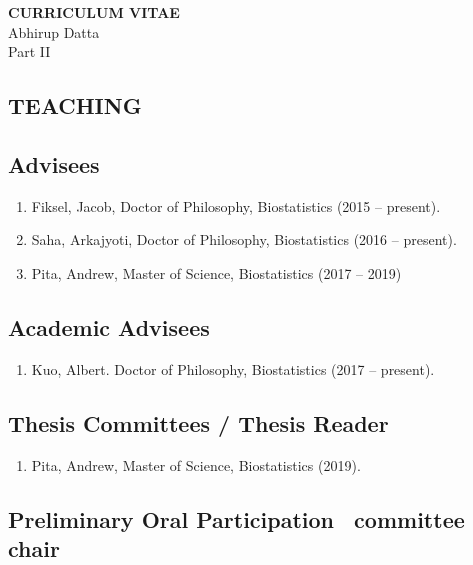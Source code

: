 \documentclass[10pt]{article}
\newcommand{\dn}[1]{{\color{black} {#1}}}
\newcommand{\myben}[1]{\smallskip\begin{enumerate}[start=1,label={\scriptsize \arabic*$\ $},leftmargin=\parindent]\setlength{\itemsep}{#1}\vspace*{-0.7em}}
\newcommand{\ee}{\end{enumerate}}
\newcommand{\mylift}[1]{\vspace*{#1}}
\begin{document}
\newpage

\begin{center}
{\bf CURRICULUM VITAE}\\
Abhirup Datta\\[3mm]
Part II
\end{center}

\vspace*{0em}

\subsection*{TEACHING}

\smallskip

\subsection*{Advisees}

\myben{-0.1em}
\item Fiksel, Jacob, Doctor of Philosophy, Biostatistics (2015 -- present).
\item Saha, Arkajyoti, Doctor of Philosophy, Biostatistics (2016 -- present).
\item Pita, Andrew, Master of Science, Biostatistics (2017 -- 2019)

\ee

\mylift{-1.5em}

\subsection*{Academic Advisees}

\myben{-0.1em}

\item Kuo, Albert. Doctor of Philosophy, Biostatistics (2017 -- present).

\ee

\mylift{-1.5em}

\subsection*{Thesis Committees / Thesis Reader}

\myben{-0.1em}

\item \dn{Pita}, Andrew, Master of Science, Biostatistics (2019).
\ee

\mylift{-1.5em}

\subsection*{Preliminary Oral Participation \ \tiny * committee chair}
\end{document}
